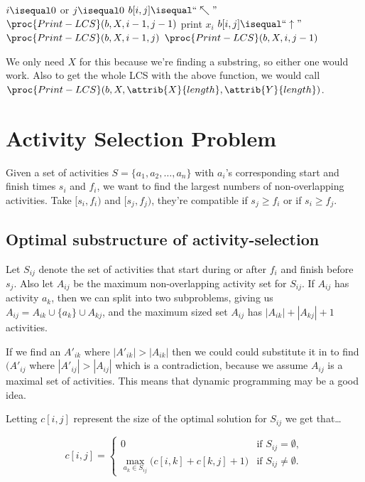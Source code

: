 \documentclass[11pt]{article}
\theoremstyle{definition}
\begin{document}
\begin{codebox}
  \li \If \(i \isequal 0\) or \(j \isequal 0\) \Then 
  \li \Return \End 
  \li \If \(b[i,j] \isequal ``\nwarrow"\) \Then 
    \li \(\proc{Print-LCS}(b,X,i-1,j-1)\)
    \li print \(x_i\)
  \li \ElseIf \(b[i,j] \isequal ``\uparrow"\) \Then
    \li \(\proc{Print-LCS}(b,X,i-1,j)\)
  \li \Else \(\proc{Print-LCS}(b,X,i,j-1)\) \End
\end{codebox}

We only need \(X\) for this because we're finding a substring, so either one would work.  Also 
to get the whole LCS with the above function, we would call 
\(\proc{Print-LCS}(b,X,\attrib{X}{length},\attrib{Y}{length})\).
\newpage 

\section*{Activity Selection Problem}
Given a set of activities \(S = \{a_1, a_2, \dots, a_n\}\) with \(a_i\)'s corresponding start 
and finish times \(s_i\) and \(f_i\), we want to find the largest numbers of non-overlapping 
activities. Take \([s_i,f_i)\) and \([s_j,f_j)\), they're compatible if \(s_j \geq f_i\) or if 
\(s_i \geq f_j\).

\subsection*{Optimal substructure of activity-selection}
Let \(S_{ij}\) denote the set of activities that start during or after \(f_i\) and finish before 
\(s_j\).  Also let \(A_{ij}\) be the maximum non-overlapping activity set for \(S_{ij}\).  If 
\(A_{ij}\) has activity \(a_k\), then we can split into two subproblems, giving us 
\(A_{ij} = A_{ik} \cup \{a_k\} \cup A_{kj}\), and the maximum sized set \(A_{ij}\) has 
\(|A_{ik}| + |A_{kj}| + 1\) activities.

If we find an \(A'_{ik}\) where \(|A'_{ik}| > |A_{ik}|\) then we could could substitute it in 
to find \((A'_{ij}\) where \(|A'_{ij}| > |A_{ij}|\) which is a contradiction, because we assume 
\(A_{ij}\) is a maximal set of activities.  This means that dynamic programming may be a good idea.

Letting \(c[i,j]\) represent the size of the optimal solution for \(S_{ij}\) we get that\dots 

\[c[i,j] = \begin{cases}
  0 & \text{if } S_{ij} = \emptyset, \\ 
  \displaystyle\max_{a_k \in S_{ij}} \big(c[i,k] + c[k,j] + 1\big) & \text{if } S_{ij} \neq \emptyset.
\end{cases}\]
\end{document}
